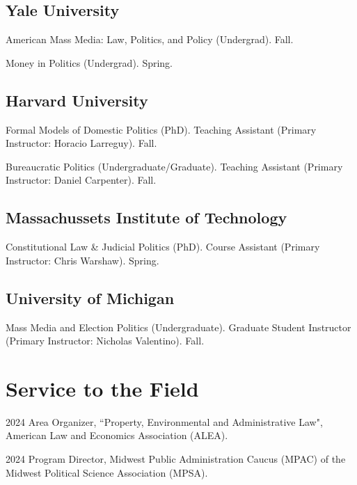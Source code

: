 \documentclass[12pt,letterpaper]{report}
\newcommand{\course}[4]{\item[#1] \tab{}#3 (#4). #2.} %
\newcommand{\tacourse}[5]{\item[#1] \tab{}#3 (#4). #5. #2.} %
\begin{document}
    \subsection*{Yale University}
    \begin{tablist}
    \course{2019}{Fall}{American Mass Media: Law, Politics, and Policy}{Undergrad}{}
    \course{2019}{Spring}{Money in Politics}{Undergrad}{}
    \end{tablist}
    
    
    \subsection*{Harvard University}
    \begin{tablist}
    \tacourse{2017}{Fall}{Formal Models of Domestic Politics}{PhD}{Teaching Assistant (Primary Instructor: Horacio Larreguy)}
    \tacourse{2016}{Fall}{Bureaucratic Politics}{Undergraduate/Graduate}{Teaching Assistant (Primary Instructor: Daniel Carpenter)}
    \end{tablist}

    \subsection*{Massachussets Institute of Technology}
    \begin{tablist}
    \tacourse{2015}{Spring}{Constitutional Law \& Judicial Politics}{PhD}{Course Assistant (Primary Instructor: Chris Warshaw)}
    \end{tablist}

   \subsection*{University of Michigan}

   \begin{tablist}
    \tacourse{2013}{Fall}{Mass Media and Election Politics}{Undergraduate}{Graduate Student Instructor (Primary Instructor: Nicholas Valentino)}
    \end{tablist}
    
    
    \section*{Service to the Field}
	
	\begin{tablist}
        \item[2024] Area Organizer, ``Property, Environmental and Administrative Law", American Law and Economics Association (ALEA).
		\item[2024] Program Director, Midwest Public Administration Caucus (MPAC) of the Midwest Political Science Association (MPSA).
	\end{tablist}
	
\end{document}
